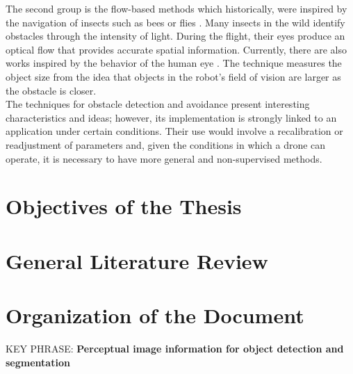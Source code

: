 The second group is the flow-based methods which historically, were inspired by the navigation of insects such as bees \cite{Srinivasan.Gregory:PTBS:1992} or flies \cite{Franceschini.Ruffier.ea:InTech:2012}. Many insects in the wild identify obstacles through the intensity of light. During the flight, their eyes produce an optical flow that provides accurate spatial information. Currently, there are also works inspired by the behavior of the human eye \cite{Al-Kaff.Meng.ea:IVS:2016}. The technique measures the object size from the idea that objects in the robot's field of vision are larger as the obstacle is closer.\\

The techniques for obstacle detection and avoidance present interesting characteristics and ideas; however, its implementation is strongly linked to an application under certain conditions. Their use would involve a recalibration or readjustment of parameters and, given the conditions in which a drone can operate, it is necessary to have more general and non-supervised methods.
 

\section{Objectives of the Thesis}

\section{General Literature Review}

\section{Organization of the Document}



KEY PHRASE: \textbf{Perceptual image information for object detection and segmentation}



